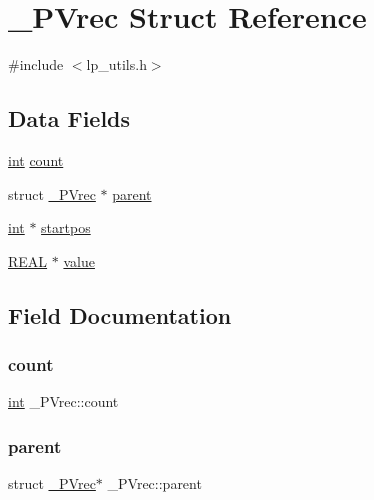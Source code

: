 \hypertarget{struct___p_vrec}{}\section{\+\_\+\+P\+Vrec Struct Reference}
\label{struct___p_vrec}


{\ttfamily \#include $<$lp\+\_\+utils.\+h$>$}

\subsection*{Data Fields}
\begin{DoxyCompactItemize}
\item 
\hyperlink{lp__lib_8h_adeb9ec6400320e4923ac9d836d509ddb}{int} \hyperlink{struct___p_vrec_ab841eba926eddea7b6ec3e047ab6609e}{count}
\item 
struct \hyperlink{struct___p_vrec}{\+\_\+\+P\+Vrec} $\ast$ \hyperlink{struct___p_vrec_a171ba903dd040af036a185e1ffc11e6d}{parent}
\item 
\hyperlink{lp__lib_8h_adeb9ec6400320e4923ac9d836d509ddb}{int} $\ast$ \hyperlink{struct___p_vrec_a437de6133a1365ae6d0164e5b8fe7d0c}{startpos}
\item 
\hyperlink{lp__lib_8h_a92bd5e363d131fa73669358edb232dce}{R\+E\+AL} $\ast$ \hyperlink{struct___p_vrec_aa48f657bdfdfd166436b3f1869ed8ec1}{value}
\end{DoxyCompactItemize}


\subsection{Field Documentation}
\mbox{\label{struct___p_vrec_ab841eba926eddea7b6ec3e047ab6609e}} 
\subsubsection{\texorpdfstring{count}{count}}
{\footnotesize\ttfamily \hyperlink{lp__lib_8h_adeb9ec6400320e4923ac9d836d509ddb}{int} \+\_\+\+P\+Vrec\+::count}

\mbox{\label{struct___p_vrec_a171ba903dd040af036a185e1ffc11e6d}} 
\subsubsection{\texorpdfstring{parent}{parent}}
{\footnotesize\ttfamily struct \hyperlink{struct___p_vrec}{\+\_\+\+P\+Vrec}$\ast$ \+\_\+\+P\+Vrec\+::parent}

